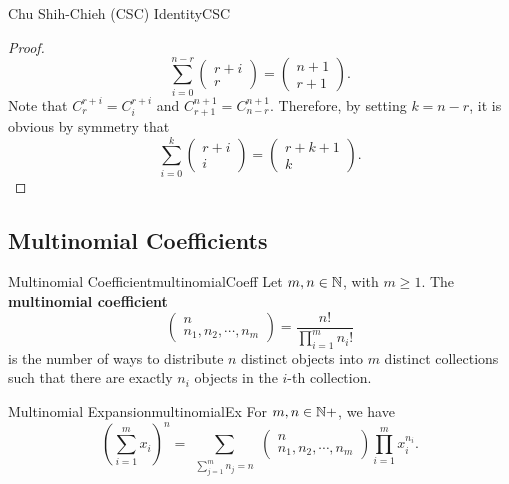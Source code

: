 \documentclass[math]{amznotes}
\theoremstyle{remark}
\begin{document}
\begin{thmbox}{Chu Shih-Chieh (CSC) Identity}{CSC}
\begin{proof}
        \begin{equation*}
            \sum_{i = 0}^{n - r}\begin{pmatrix}
                r + i \\
                r
            \end{pmatrix} = \begin{pmatrix}
                n + 1 \\
                r + 1
            \end{pmatrix}.
        \end{equation*}
        Note that $C^{r + i}_r = C^{r + i}_i$ and $C^{n + 1}_{r + 1} = C^{n + 1}_{n - r}$. Therefore, by setting $k = n - r$, it is obvious by symmetry that
        \begin{equation*}
            \sum_{i = 0}^{k}\begin{pmatrix}
                r + i \\
                i
            \end{pmatrix} = \begin{pmatrix}
                r + k + 1 \\
                k
            \end{pmatrix}.
        \end{equation*}
    \end{proof}
\end{thmbox}
\subsection{Multinomial Coefficients}
\begin{dfnbox}{Multinomial Coefficient}{multinomialCoeff}
    Let $m, n \in \mathbb{N}$, with $m \geq 1$. The {\color{red} \textbf{multinomial coefficient}}
    \begin{displaymath}
        \begin{pmatrix}
            n \\
            n_1, n_2, \cdots, n_m
        \end{pmatrix} = \frac{n!}{\prod_{i = 1}^{m}n_i!}
    \end{displaymath}
    is the number of ways to distribute $n$ distinct objects into $m$ distinct collections such that there are exactly $n_i$ objects in the $i$-th collection.
\end{dfnbox}
\begin{thmbox}{Multinomial Expansion}{multinomialEx}
    For $m, n \in \mathbb{N}+$, we have
    \begin{equation*}
        \left(\sum_{i = 1}^{m}x_i\right)^n = \sum_{\substack{\sum_{j = 1}^{m}n_j = n}} \begin{pmatrix}
            n \\
            n_1, n_2, \cdots, n_m
        \end{pmatrix}\prod_{i = 1}^{m}x_i^{n_i}.
    \end{equation*}
\end{thmbox}
\end{document}
